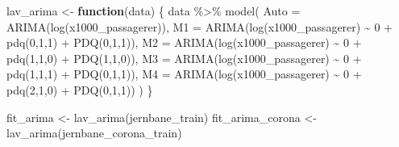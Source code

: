 \documentclass[
  danish,
]{article}
\newenvironment{Shaded}{\begin{snugshade}}{\end{snugshade}}
\newcommand{\AttributeTok}[1]{\textcolor[rgb]{0.40,0.45,0.13}{#1}}
\newcommand{\ControlFlowTok}[1]{\textcolor[rgb]{0.00,0.23,0.31}{\textbf{#1}}}
\newcommand{\DecValTok}[1]{\textcolor[rgb]{0.68,0.00,0.00}{#1}}
\newcommand{\FunctionTok}[1]{\textcolor[rgb]{0.28,0.35,0.67}{#1}}
\newcommand{\NormalTok}[1]{\textcolor[rgb]{0.00,0.23,0.31}{#1}}
\newcommand{\OtherTok}[1]{\textcolor[rgb]{0.00,0.23,0.31}{#1}}
\newcommand{\SpecialCharTok}[1]{\textcolor[rgb]{0.37,0.37,0.37}{#1}}
\begin{document}
\begin{Shaded}
\begin{Highlighting}[]
\NormalTok{lav\_arima }\OtherTok{\textless{}{-}} \ControlFlowTok{function}\NormalTok{(data) \{}
\NormalTok{  data }\SpecialCharTok{\%\textgreater{}\%}
    \FunctionTok{model}\NormalTok{(}
      \AttributeTok{Auto =} \FunctionTok{ARIMA}\NormalTok{(}\FunctionTok{log}\NormalTok{(x1000\_passagerer)),}
      \AttributeTok{M1   =} \FunctionTok{ARIMA}\NormalTok{(}\FunctionTok{log}\NormalTok{(x1000\_passagerer) }\SpecialCharTok{\textasciitilde{}} \DecValTok{0} \SpecialCharTok{+} \FunctionTok{pdq}\NormalTok{(}\DecValTok{0}\NormalTok{,}\DecValTok{1}\NormalTok{,}\DecValTok{1}\NormalTok{) }\SpecialCharTok{+} \FunctionTok{PDQ}\NormalTok{(}\DecValTok{0}\NormalTok{,}\DecValTok{1}\NormalTok{,}\DecValTok{1}\NormalTok{)),}
      \AttributeTok{M2   =} \FunctionTok{ARIMA}\NormalTok{(}\FunctionTok{log}\NormalTok{(x1000\_passagerer) }\SpecialCharTok{\textasciitilde{}} \DecValTok{0} \SpecialCharTok{+} \FunctionTok{pdq}\NormalTok{(}\DecValTok{1}\NormalTok{,}\DecValTok{1}\NormalTok{,}\DecValTok{0}\NormalTok{) }\SpecialCharTok{+} \FunctionTok{PDQ}\NormalTok{(}\DecValTok{1}\NormalTok{,}\DecValTok{1}\NormalTok{,}\DecValTok{0}\NormalTok{)),}
      \AttributeTok{M3   =} \FunctionTok{ARIMA}\NormalTok{(}\FunctionTok{log}\NormalTok{(x1000\_passagerer) }\SpecialCharTok{\textasciitilde{}} \DecValTok{0} \SpecialCharTok{+} \FunctionTok{pdq}\NormalTok{(}\DecValTok{1}\NormalTok{,}\DecValTok{1}\NormalTok{,}\DecValTok{1}\NormalTok{) }\SpecialCharTok{+} \FunctionTok{PDQ}\NormalTok{(}\DecValTok{0}\NormalTok{,}\DecValTok{1}\NormalTok{,}\DecValTok{1}\NormalTok{)),}
      \AttributeTok{M4   =} \FunctionTok{ARIMA}\NormalTok{(}\FunctionTok{log}\NormalTok{(x1000\_passagerer) }\SpecialCharTok{\textasciitilde{}} \DecValTok{0} \SpecialCharTok{+} \FunctionTok{pdq}\NormalTok{(}\DecValTok{2}\NormalTok{,}\DecValTok{1}\NormalTok{,}\DecValTok{0}\NormalTok{) }\SpecialCharTok{+} \FunctionTok{PDQ}\NormalTok{(}\DecValTok{0}\NormalTok{,}\DecValTok{1}\NormalTok{,}\DecValTok{1}\NormalTok{))}
\NormalTok{    )}
\NormalTok{\}}

\NormalTok{fit\_arima        }\OtherTok{\textless{}{-}} \FunctionTok{lav\_arima}\NormalTok{(jernbane\_train)}
\NormalTok{fit\_arima\_corona }\OtherTok{\textless{}{-}} \FunctionTok{lav\_arima}\NormalTok{(jernbane\_corona\_train)}
\end{Highlighting}
\end{Shaded}
\end{document}
